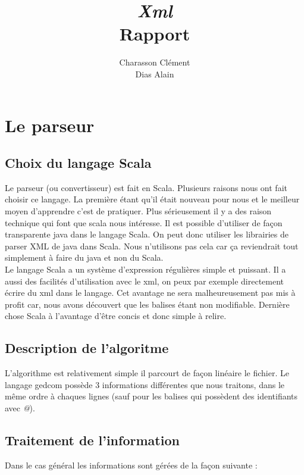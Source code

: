 \documentclass[12pt,a4paper]{article}
\title{\huge \textbf {\emph{Xml} \\Rapport}}
\author{Charasson Clément \\ Dias Alain}
\begin{document}
\maketitle

\section{Le parseur}

\subsection{Choix du langage Scala}

Le parseur (ou convertisseur) est fait en Scala. Plusieurs raisons nous ont fait choisir ce
langage. La première étant qu'il était nouveau pour nous et le meilleur moyen
d'apprendre c'est de pratiquer. Plus sérieusement il y a des raison technique
qui font que scala nous intéresse. Il est possible d'utiliser de façon
transparente java dans le langage Scala. On peut	 donc utiliser les librairies de
parser XML de java dans Scala. Nous n'utilisons pas cela car ça reviendrait
tout simplement à faire du java et non du Scala.\\
Le langage Scala a un système d'expression régulières simple et puissant. Il a
aussi des facilités d'utilisation avec le xml, on peux par exemple directement 
écrire du xml dans le langage. Cet avantage ne sera malheureusement pas mis à 
profit car, nous avons découvert que les balises étant non modifiable.
Dernière chose Scala à l'avantage d'être concis et donc simple à
relire.


\subsection{Description de l'algoritme}


L'algorithme est relativement simple il parcourt de façon linéaire le fichier.
Le langage gedcom possède 3 informations différentes que nous
traitons, dans le même ordre à chaques lignes (sauf pour les balises
qui possèdent des identifiants avec \emph{@}).


\subsection{Traitement de l'information}

Dans le cas général les informations sont gérées de la façon suivante :\\
\end{document}
